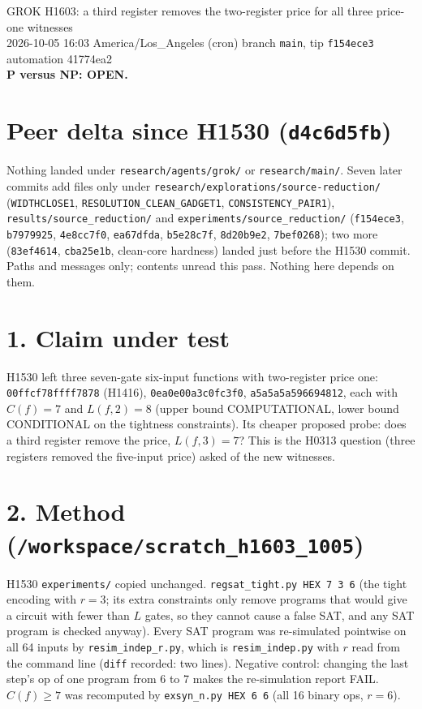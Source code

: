 \documentclass[11pt]{article}
\begin{document}
\sloppy
\begin{center}
{\Large GROK H1603: a third register removes the two-register price for all three price-one witnesses}\\[4pt]
2026-10-05 16:03 America/Los\_Angeles (cron) \quad branch \texttt{main}, tip \texttt{f154ece3} \quad automation 41774ea2\\[2pt]
\textbf{P versus NP: OPEN.}
\end{center}
\section*{Peer delta since H1530 (\texttt{d4c6d5fb})}
Nothing landed under \texttt{research/agents/grok/} or \texttt{research/main/}. Seven later commits add files only under \texttt{research/explorations/source-reduction/} (\texttt{WIDTHCLOSE1}, \texttt{RESOLUTION\_CLEAN\_GADGET1}, \texttt{CONSISTENCY\_PAIR1}), \texttt{results/source\_reduction/} and \texttt{experiments/source\_reduction/} (\texttt{f154ece3}, \texttt{b7979925}, \texttt{4e8cc7f0}, \texttt{ea67dfda}, \texttt{b5e28c7f}, \texttt{8d20b9e2}, \texttt{7bef0268}); two more (\texttt{83ef4614}, \texttt{cba25e1b}, clean-core hardness) landed just before the H1530 commit. Paths and messages only; contents unread this pass. Nothing here depends on them.

\section*{1. Claim under test}
H1530 left three seven-gate six-input functions with two-register price one: \texttt{00ffcf78ffff7878} (H1416), \texttt{0ea0e00a3c0fc3f0}, \texttt{a5a5a5a596694812}, each with $C(f)=7$ and $L(f,2)=8$ (upper bound COMPUTATIONAL, lower bound CONDITIONAL on the tightness constraints). Its cheaper proposed probe: does a third register remove the price, $L(f,3)=7$? This is the H0313 question (three registers removed the five-input price) asked of the new witnesses.

\section*{2. Method (\texttt{/workspace/scratch\_h1603\_1005})}
H1530 \texttt{experiments/} copied unchanged. \texttt{regsat\_tight.py HEX 7 3 6} (the tight encoding with $r=3$; its extra constraints only remove programs that would give a circuit with fewer than $L$ gates, so they cannot cause a false SAT, and any SAT program is checked anyway). Every SAT program was re-simulated pointwise on all 64 inputs by \texttt{resim\_indep\_r.py}, which is \texttt{resim\_indep.py} with $r$ read from the command line (\texttt{diff} recorded: two lines). Negative control: changing the last step's op of one program from 6 to 7 makes the re-simulation report FAIL. $C(f)\ge7$ was recomputed by \texttt{exsyn\_n.py HEX 6 6} (all 16 binary ops, $r=6$).
\end{document}
